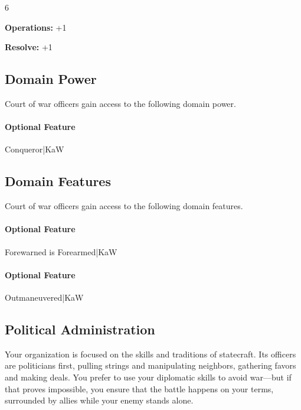 \documentclass[10pt,a4paper,twoside,bg=print,twocolumn,openany,nodeprecatedcode]{dndbook}
\begin{document}
{\par \vspace { 9pt plus 3pt minus 3pt } \noindent  {} \nopagebreak }

\begin{itemize}
\begin{multicols}{6}
\item \textbf{Operations:} +1
\item \textbf{Resolve:} +1
\end{multicols}

\end{itemize}

\subsection{Domain Power}
Court of war officers gain access to the following domain power.

\paragraph{Optional Feature}
Conqueror|KaW

\subsection{Domain Features}
Court of war officers gain access to the following domain features.

\paragraph{Optional Feature}
Forewarned is Forearmed|KaW

\paragraph{Optional Feature}
Outmaneuvered|KaW

\subsection{Political Administration}
Your organization is focused on the skills and traditions of statecraft. Its officers are politicians first, pulling strings and manipulating neighbors, gathering favors and making deals. You prefer to use your diplomatic skills to avoid war—but if that proves impossible, you ensure that the battle happens on your terms, surrounded by allies while your enemy stands alone.

{\par \vspace { 9pt plus 3pt minus 3pt } \noindent  {} \nopagebreak }
\end{document}
